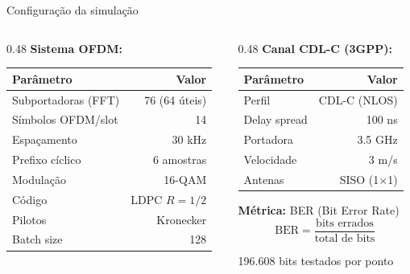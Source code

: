 \documentclass[aspectratio=169, 11pt]{beamer}
\begin{document}
\begin{frame}{Configuração da simulação}
    \begin{columns}[T]
        \begin{column}{0.48\textwidth}
            \textbf{Sistema OFDM:}
            \small
            \begin{tabular}{lr}
                \toprule
                \textbf{Parâmetro} & \textbf{Valor} \\
                \midrule
                Subportadoras (FFT) & 76 (64 úteis) \\
                Símbolos OFDM/slot & 14 \\
                Espaçamento & 30 kHz \\
                Prefixo cíclico & 6 amostras \\
                Modulação & 16-QAM \\
                Código & LDPC $R=1/2$ \\
                Pilotos & Kronecker \\
                Batch size & 128 \\
                \bottomrule
            \end{tabular}
        \end{column}
        \begin{column}{0.48\textwidth}
            \textbf{Canal CDL-C (3GPP):}
            \small
            \begin{tabular}{lr}
                \toprule
                \textbf{Parâmetro} & \textbf{Valor} \\
                \midrule
                Perfil & CDL-C (NLOS) \\
                Delay spread & 100 ns \\
                Portadora & 3.5 GHz \\
                Velocidade & 3 m/s \\
                Antenas & SISO (1$\times$1) \\
                \bottomrule
            \end{tabular}

            \vspace{0.5cm}
            \textbf{Métrica:} BER (Bit Error Rate)
            $$\text{BER} = \frac{\text{bits errados}}{\text{total de bits}}$$

            \small 196.608 bits testados por ponto
        \end{column}
    \end{columns}
\end{frame}
\end{document}

